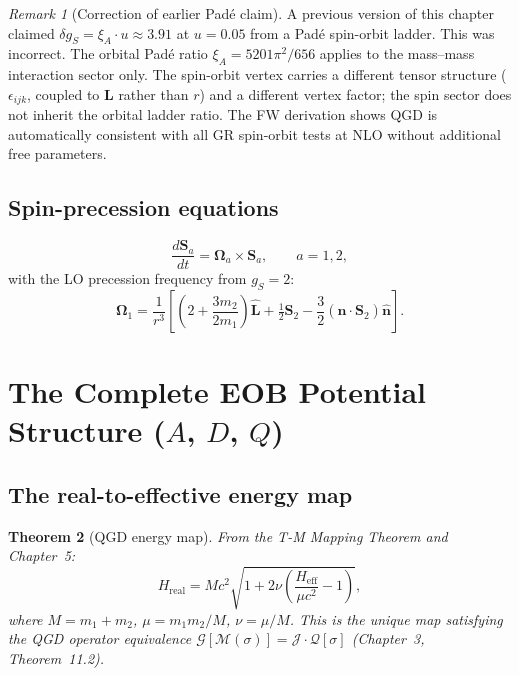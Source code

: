 \documentclass[11pt,a4paper]{article}
\theoremstyle{plain}
\newtheorem{theorem}{Theorem}[section]
\theoremstyle{definition}
\theoremstyle{remark}
\newtheorem{remark}[theorem]{Remark}
\newcommand{\half}{\tfrac{1}{2}}
\newcommand{\Heff}{H_{\mathrm{eff}}}
\newcommand{\Hreal}{H_{\mathrm{real}}}
\newcommand{\xiA}{\xi_A}
\begin{document}
\begin{remark}[Correction of earlier Pad\'e claim]
A previous version of this chapter claimed $\delta g_S = \xiA\cdot u \approx 3.91$
at $u=0.05$ from a Pad\'e spin-orbit ladder.  This was incorrect.
The orbital Pad\'e ratio $\xiA = 5201\pi^2/656$ applies to the mass--mass
interaction sector only.  The spin-orbit vertex carries a different tensor
structure ($\epsilon_{ijk}$, coupled to $\mathbf{L}$ rather than $r$)
and a different vertex factor; the spin sector does not inherit the orbital
ladder ratio.  The FW derivation shows QGD is automatically consistent with
all GR spin-orbit tests at NLO without additional free parameters.
\end{remark}

\subsection{Spin-precession equations}

\begin{equation}
  \frac{d\mathbf{S}_a}{dt} = \boldsymbol{\Omega}_a\times\mathbf{S}_a,\qquad a=1,2,
  \label{eq:prec}
\end{equation}
with the LO precession frequency from $g_S=2$:
\begin{equation}
  \boldsymbol{\Omega}_1 = \frac{1}{r^3}\!\left[\!\left(2+\frac{3m_2}{2m_1}\right)
    \hat{\mathbf{L}}
    + \half\mathbf{S}_2
    - \frac{3}{2}(\hat{\mathbf{n}}\cdot\mathbf{S}_2)\hat{\mathbf{n}}\right].
  \label{eq:prec_freq}
\end{equation}

\section{The Complete EOB Potential Structure ($A$, $D$, $Q$)}
\label{sec:ADQ}

\subsection{The real-to-effective energy map}

\begin{theorem}[QGD energy map]\label{thm:map}
From the T-M Mapping Theorem and Chapter~5:
\begin{equation}
  \boxed{\Hreal = Mc^2\sqrt{1+2\nu\!\left(\frac{\Heff}{\mu c^2}-1\right)},}
  \label{eq:map}
\end{equation}
where $M=m_1+m_2$, $\mu=m_1m_2/M$, $\nu=\mu/M$.  This is the unique map
satisfying the QGD operator equivalence $\mathcal{G}[\mathcal{M}(\sigma)]
= \mathcal{J}\cdot\mathcal{Q}[\sigma]$ (Chapter~3, Theorem~11.2).
\end{theorem}
\end{document}
